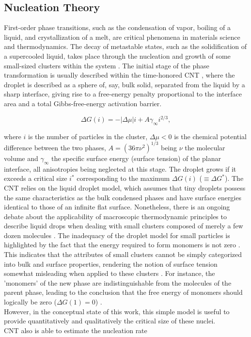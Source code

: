 \subsection{Nucleation Theory}
First-order phase transitions, such as the condensation of vapor, boiling of a liquid, and crystallization of a melt, are critical phenomena in materials science and thermodynamics.
The decay of metastable states, such as the solidification of a supercooled liquid, takes place through the nucleation and growth of some small-sized clusters within the system \cite{Larissa}. The 
initial stage of the phase transformation is usually described within the time-honored CNT \cite{Volmer1926,Hayashi1974}, where the droplet is described as a sphere of, say, bulk solid, 
separated from the liquid by a sharp interface, giving rise to a free-energy penalty proportional to the interface area and a total Gibbs-free-energy activation barrier.

\begin{equation}
    \Delta G(i) = -|\Delta\mu|i + A\gamma_{\infty} i^{2/3},
\end{equation}

where \(i\) is the number of particles in the cluster, \(\Delta\mu < 0\) is the chemical potential difference between the two phases, \(A = (36 \pi \nu^2)^{1/3}\) being \(\nu\) 
the molecular volume and \(\gamma_{\infty}\) the specific surface energy (surface tension) of the planar interface, all anisotropies being neglected at this stage. The droplet grows if it exceeds a 
critical size \(i^\ast\) corresponding to the maximum \(\Delta G(i)\) (\(\equiv \Delta G^\ast\)). 
The CNT relies on the liquid droplet model, which assumes that tiny droplets possess the same characteristics as the bulk 
condensed phases and have surface energies identical to those of an infinite flat surface. Nonetheless, there is an ongoing 
debate about the applicability of macroscopic thermodynamic principles to describe liquid drops when dealing with small clusters 
composed of merely a few dozen molecules \cite{Wilemski}. The inadequacy of the droplet model for small particles is highlighted by the fact that the 
energy required to form monomers is not zero \cite{Gránásy}. This indicates that the attributes of small clusters cannot be 
simply categorized into bulk and surface properties, rendering the notion of surface tension somewhat misleading when applied to these clusters \cite{Anisimov}.
For instance, the 'monomers' of the new phase are indistinguishable from the molecules of the parent phase, leading to the conclusion that the free energy of monomers should logically 
be zero (\(\Delta G(1) = 0\)) \cite{Laszlo1}. 
\\
However, in the conceptual state of this work, this simple model is useful to provide quantitatively and qualitatively the critical size of these nuclei.
\\
CNT also is able to estimate the nucleation rate

